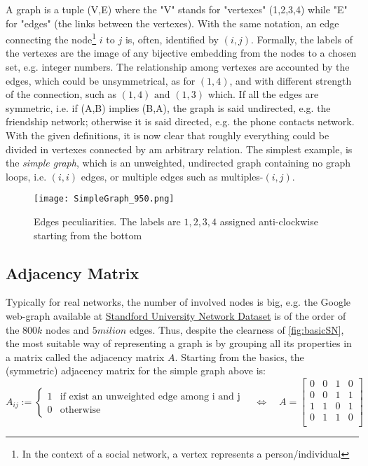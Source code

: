 \documentclass[a4paper,12pt,twoside]{book} %
\theoremstyle{definition}
\begin{document}
A graph is a tuple (V,E) where the "V" stands for "vertexes" (1,2,3,4) while "E" for "edges" (the links between the vertexes).
With the same notation, an edge connecting the node\footnote{In the context of a social network, a vertex represents a person/individual} $i$ to $j$ is, often, identified by $(i,j)$.
Formally, the labels of the vertexes are the image of any bijective embedding from the nodes to a chosen set, e.g. integer numbers. The relationship among vertexes are accounted by the edges, which could be unsymmetrical, as for $(1,4)$, and with different strength of the connection, such as $(1,4) \text{ and } (1,3)$ which. If all the edges are symmetric, i.e. if (A,B) implies (B,A), the graph is said undirected, e.g. the friendship network; otherwise it is said directed, e.g. the phone contacts network. 
With the given definitions, it is now clear that roughly everything could be divided in vertexes connected by am arbitrary relation.
The simplest example, is the \textit{simple graph}, which is an unweighted, undirected graph containing no graph loops, i.e. $(i,i)$ edges, or multiple edges such as multiples-$(i,j)$.
\begin{figure}[ht]
	\texttt{[image: SimpleGraph\_950.png]}
	\caption{Edges peculiarities. The labels are $1,2,3,4$ assigned anti-clockwise starting from the bottom}
	\label{fig:simple}
\end{figure}
\newpage

\subsection{Adjacency Matrix}
Typically for real networks, the number of involved nodes is big, e.g. the Google web-graph available at \href{https://snap.stanford.edu/data/#socnets}{Standford University Network Dataset} is of the order of the $800k$ nodes and $5milion$ edges. Thus, despite the clearness of \autoref{fig:basicSN}, the most suitable way of representing a graph is by grouping all its properties in a matrix called the adjacency matrix $A$. 
Starting from the basics, the (symmetric) adjacency matrix for the simple graph above is:
\[
A_{ij} :=
\begin{cases}
1 & \text{if exist an unweighted edge among i and j} \\
0 & \text{otherwise}
\end{cases}
\quad
\Leftrightarrow
\quad
A = 
\begin{bmatrix}
0 & 0 & 1 & 0 \\
0 & 0 & 1 & 1 \\
1 & 1 & 0 & 1 \\
0 & 1 & 1 & 0 \\
\end{bmatrix}
\]
\end{document}
